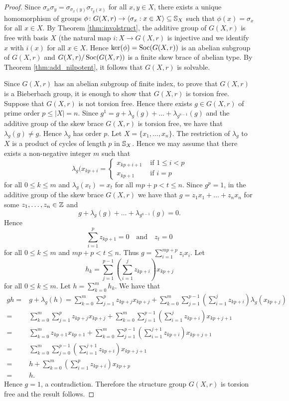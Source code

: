 \begin{proof}
Since $\sigma_x\sigma_y=\sigma_{\sigma_x(y)}\sigma_{\tau_y(x)}$ for all $x,y\in X$, there exists a unique homomorphism of groups
$\phi\colon G(X,r)\to\langle \sigma_x : x\in X\rangle\subseteq\mathbb{S}_X$ such that $\phi(x)=\sigma_x$ for all $x\in X$. By Theorem \ref{thm:involstruct}, the additive group of $G(X,r)$ is free with basis $X$ (the natural map $i\colon X\to G(X,r)$ is injective and we identify $x$ with $i(x)$ for all $x\in X$. Hence $\ker(\phi)=\operatorname{Soc}(G(X,r))$ is an abelian subgroup of $G(X,r)$ and $G(X,r)/\operatorname{Soc}(G(X,r))$ is a finite skew brace of abelian type. By Theorem \ref{thm:add_nilpotent}, it follows that $G(X,r)$ is solvable.

Since $G(X,r)$ has an abelian subgroup of finite index, to prove that $G(X,r)$ is a Bieberbach group, it is enough to show that $G(X,r)$ is torsion free.
Suppose that $G(X,r)$ is not torsion free. Hence there exists $g\in G(X,r)$ of prime order $p\leq |X|=n$. Since
$g^1=g+\lambda_g(g)+\dots +\lambda_{g^{n-1}}(g)$ and the additive group of the skew brace $G(X,r)$ is torsion free, we have that $\lambda_g(g)\neq g$. Hence $\lambda_g$ has order $p$. Let $X=\{ x_1,\dots ,x_n\}$. The restriction of $\lambda_g$ to $X$ is a product of cycles of length $p$ in $\mathbb{S}_X$. Hence we may assume that there exists a non-negative integer $m$ such that
\[\lambda_g(x_{kp+i}=\left\{\begin{array}{ll}
x_{kp+i+1}&\text{ if }1\leq i<p\\
x_{kp+1}&\text{ if }i=p\end{array}\right.\]
for all $0\leq k\leq m$ and $\lambda_g(x_t)=x_t$ for all $mp+p<t\leq n$.
Since $g^p=1$, in the additive group of the skew brace $G(X,r)$ we have that $g=z_1x_1+\dots +z_nx_n$ for some $z_1,\dots ,z_n\in\mathbb{Z}$ and 
\[g+\lambda_g(g)+\dots +\lambda_{g^{n-1}}(g)=0.\]
Hence
\[\sum_{i=1}^pz_{kp+1}=0\quad\text{and}\quad z_t=0\]
for all $0\leq k\leq m$ and $mp+p<t\leq n$. Thus $g=\sum_{i=1}^{mp+p}z_ix_i$. Let
\[ 
h_k=\sum_{j=1}^{p-1}\left(\sum_{i=1}^jz_{kp+i}\right)x_{kp+j}
\]
for all $0\leq k\leq m$. Let $h=\sum_{k=0}^mh_k$. We have that
\begin{align*}
    gh=&g+\lambda_g(h)=\sum_{k=0}^m\sum_{j=1}^pz_{kp+j}x_{kp+j}+\sum_{k=0}^m\sum_{j=1}^{p-1}\left(\sum_{i=1}^jz_{kp+i}\right)\lambda_g(x_{kp+j})\\
    =&\sum_{k=0}^m\sum_{j=1}^pz_{kp+j}x_{kp+j}+\sum_{k=0}^m\sum_{j=1}^{p-1}\left(\sum_{i=1}^jz_{kp+i}\right)x_{kp+j+1}\\
    =&\sum_{k=0}^mz_{kp+1}x_{kp+1}+\sum_{k=0}^m\sum_{j=1}^{p-1}\left(\sum_{i=1}^{j+1}z_{kp+i}\right)x_{kp+j+1}\\
    =&\sum_{k=0}^m\sum_{j=0}^{p-1}\left(\sum_{i=1}^{j+1}z_{kp+i}\right)x_{kp+j+1}\\
    =&h+\sum_{k=0}^m\left(\sum_{i=1}^pz_{kp+i}\right)x_{kp+p}\\
    =&h.
\end{align*}
Hence $g=1$, a contradiction. Therefore the structure group $G(X,r)$ is torsion free and the result follows.
\end{proof}




